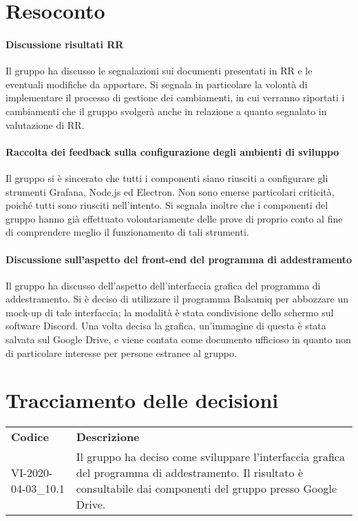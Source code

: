 \documentclass{article}
\begin{document}
\section{Resoconto}%
\label{resoconto}
\paragraph*{Discussione risultati RR}
Il gruppo ha discusso le segnalazioni sui documenti presentati in RR e le eventuali modifiche da apportare. Si segnala in particolare la volontà di implementare il processo di gestione dei cambiamenti, in cui verranno riportati i cambiamenti che il gruppo svolgerà anche in relazione a quanto segnalato in valutazione di RR.

\paragraph*{Raccolta dei feedback sulla configurazione degli ambienti di sviluppo}
Il gruppo si è sincerato che tutti i componenti siano riusciti a configurare gli strumenti Grafana, Node.js ed Electron. Non sono emerse particolari criticità, poiché tutti sono riusciti nell'intento. Si segnala inoltre che i componenti del gruppo hanno già effettuato volontariamente delle prove di proprio conto al fine di comprendere meglio il funzionamento di tali strumenti.

\paragraph*{Discussione sull'aspetto del front-end del programma di addestramento}
Il gruppo ha discusso dell'aspetto dell'interfaccia grafica del programma di addestramento. Si è deciso di utilizzare il programma Balsamiq per abbozzare un mock-up di tale interfaccia; la modalità è stata condivisione dello schermo sul software Discord. Una volta decisa la grafica, un'immagine di questa è stata salvata sul Google Drive, e viene contata come documento ufficioso in quanto non di particolare interesse per persone estranee al gruppo.

\section{Tracciamento delle decisioni}
\begin{table}[H]
  \centering
  \begin{tabular}{p{4cm}|p{12cm}}
    \rowcolor{lightgray}
    \textbf{Codice}  & \textbf{Descrizione}      \\
    VI-2020-04-03\_10.1  & Il gruppo ha deciso come sviluppare l'interfaccia grafica del programma di addestramento. Il risultato è consultabile dai componenti del gruppo presso Google Drive. \\
  \end{tabular}
\end{table}
\end{document}
